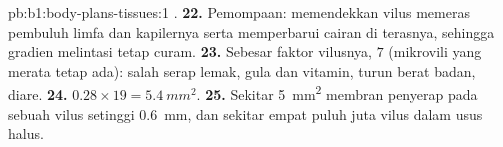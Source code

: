 \begin{solution}{pb:b1:body-plans-tissues:1}
.
\textbf{22.} Pemompaan: memendekkan vilus memeras pembuluh limfa dan
kapilernya serta memperbarui cairan di terasnya, sehingga gradien
melintasi  tetap curam.
\textbf{23.} Sebesar faktor vilusnya, $7$ (mikrovili  yang
merata tetap ada): salah serap lemak, gula dan vitamin, turun berat
badan, diare.
\textbf{24.} $0.28\times 19 = \qty{5.4}{mm^2}$.
\textbf{25.} Sekitar \qty{5}{mm^2} membran penyerap pada sebuah vilus
setinggi \qty{0.6}{mm}, dan sekitar empat puluh juta vilus dalam usus
halus.
\end{solution}
